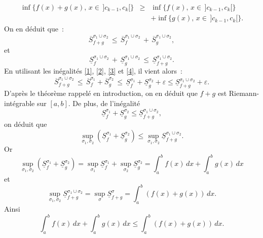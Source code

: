 {\begin{enumerate}
{\begin{eqnarray*}
\inf\{f(x) + g(x), \,x \in \,]c_{k-1}, c_{k}[\} & \geq &
\inf\{f(x),\,x \in \,]c_{k-1}, c_{k}[\}\\ & & + \inf\{g(x), \,x
\in \,]c_{k-1}, c_{k}[\}.
\end{eqnarray*}
On en d\'eduit que~:
\begin{equation}\label{3}
\overline{S}_{f+g}^{\sigma_{1}\cup\sigma_{2}} \,\leq\,
\overline{S}_{f}^{\sigma_{1}\cup\sigma_{2}}\,+\,\overline{S}_{g}^{\sigma_{1}\cup\sigma_{2}},
\end{equation}
et
\begin{equation}\label{4}
\underline{S}_{f}^{\sigma_{1}\cup\sigma_{2}}\,+\,
\underline{S}_{g}^{\sigma_{1}\cup\sigma_{2}} \,\leq\,
\underline{S}_{f+g}^{\sigma_{1}\cup\sigma_{2}}.
\end{equation}
En utilisant les in\'egalit\'es \eqref{1}, \eqref{2}, \eqref{3} et
\eqref{4}, il vient alors~:
\begin{equation*}
\overline{S}_{f+g}^{\sigma_{1}\cup\sigma_{2}}\,\leq\,
\overline{S}_{f}^{\sigma_{1}}+
\overline{S}_{g}^{\sigma_{2}}\,\leq\,
\underline{S}_{f}^{\sigma_{1}} + \underline{S}_{g}^{\sigma_{2}} +
\varepsilon \leq \underline{S}_{f+g}^{\sigma_{1}\cup\sigma_{2}} +
\varepsilon.
\end{equation*}
D'apr\`es le th\'eor\`eme rappel\'e en introduction, on en d\'eduit que $f+g$ est
Riemann-int\'egrable sur $[a, b]$. De plus, de l'in\'egalit\'e
\begin{equation*}
\underline{S}_{f}^{\sigma_{1}} + \underline{S}_{g}^{\sigma_{2}}
\leq \underline{S}_{f+g}^{\sigma_{1}\cup\sigma_{2}},
\end{equation*}
on d\'eduit que
\begin{equation*}
\sup_{\sigma_1, \sigma_{2}}\left(\underline{S}_{f}^{\sigma_{1}} +
\underline{S}_{g}^{\sigma_{2}} \right) \leq \sup_{\sigma_1,
\sigma_{2}}\underline{S}_{f+g}^{\sigma_{1}\cup\sigma_{2}}.
\end{equation*}
Or $$\sup_{\sigma_1,
\sigma_{2}}\left(\underline{S}_{f}^{\sigma_{1}} +
\underline{S}_{g}^{\sigma_{2}} \right) =
\sup_{\sigma_{1}}\underline{S}_{f}^{\sigma_{1}} +
\sup_{\sigma_{2}}\underline{S}_{g}^{\sigma_{2}} = \int_{a}^{b}
f(x)\,dx + \int_{a}^{b} g(x)\,dx $$ et
$$\sup_{\sigma_1,
\sigma_{2}}\underline{S}_{f+g}^{\sigma_{1}\cup\sigma_{2}} =
\sup_{\sigma}\underline{S}_{f+g}^{\sigma} = \int_{a}^{b}\left(f(x)
+ g(x)\right)\,dx.$$ Ainsi
\begin{equation*}
 \int_{a}^{b}
f(x)\,dx + \int_{a}^{b} g(x)\,dx \leq \int_{a}^{b}\left(f(x) +
g(x)\right)\,dx.
\end{equation*}
}
\end{enumerate}}
